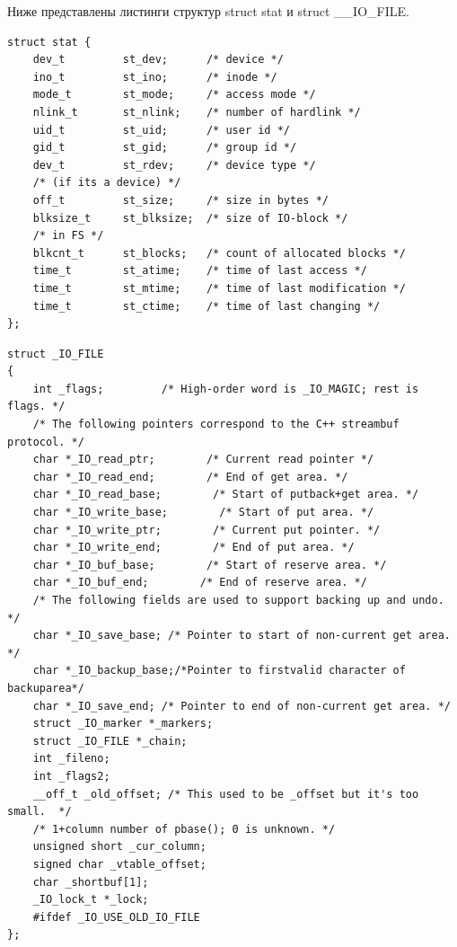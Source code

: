 \documentclass[14pt,a4paper]{scrreprt}
\begin{document}
Ниже представлены листинги структур struct stat и struct \_\_IO\_FILE.

\begin{lstlisting}[caption=struct stat]
struct stat {
	dev_t         st_dev;      /* device */
	ino_t         st_ino;      /* inode */
	mode_t        st_mode;     /* access mode */
	nlink_t       st_nlink;    /* number of hardlink */
	uid_t         st_uid;      /* user id */
	gid_t         st_gid;      /* group id */
	dev_t         st_rdev;     /* device type */
	/* (if its a device) */
	off_t         st_size;     /* size in bytes */
	blksize_t     st_blksize;  /* size of IO-block */
	/* in FS */
	blkcnt_t      st_blocks;   /* count of allocated blocks */
	time_t        st_atime;    /* time of last access */
	time_t        st_mtime;    /* time of last modification */
	time_t        st_ctime;    /* time of last changing */
};
\end{lstlisting}

\begin{lstlisting}[caption=struct \_\_IO\_FILE]
struct _IO_FILE
{
	int _flags;         /* High-order word is _IO_MAGIC; rest is flags. */
	/* The following pointers correspond to the C++ streambuf protocol. */
	char *_IO_read_ptr;        /* Current read pointer */
	char *_IO_read_end;        /* End of get area. */
	char *_IO_read_base;        /* Start of putback+get area. */
	char *_IO_write_base;        /* Start of put area. */
	char *_IO_write_ptr;        /* Current put pointer. */
	char *_IO_write_end;        /* End of put area. */
	char *_IO_buf_base;        /* Start of reserve area. */
	char *_IO_buf_end;        /* End of reserve area. */
	/* The following fields are used to support backing up and undo. */
	char *_IO_save_base; /* Pointer to start of non-current get area. */
	char *_IO_backup_base;/*Pointer to firstvalid character of backuparea*/
	char *_IO_save_end; /* Pointer to end of non-current get area. */
	struct _IO_marker *_markers;
	struct _IO_FILE *_chain;
	int _fileno;
	int _flags2;
	__off_t _old_offset; /* This used to be _offset but it's too small.  */
	/* 1+column number of pbase(); 0 is unknown. */
	unsigned short _cur_column;
	signed char _vtable_offset;
	char _shortbuf[1];
	_IO_lock_t *_lock;
	#ifdef _IO_USE_OLD_IO_FILE
};
\end{lstlisting}
\end{document}
